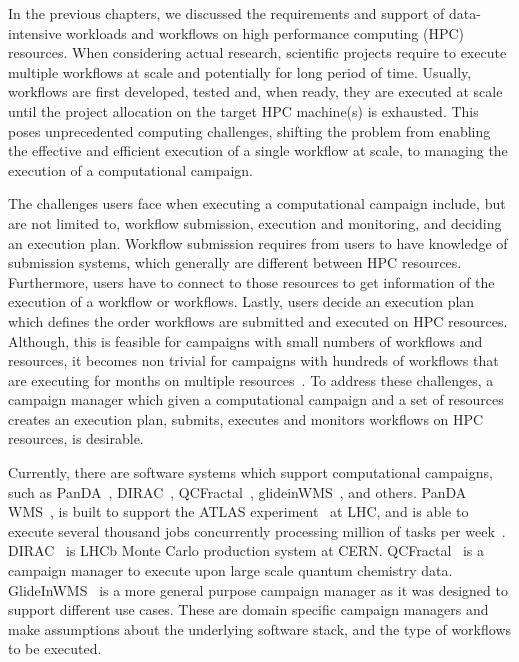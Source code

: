 \label{ch:cmanager}

In the previous chapters, we discussed the requirements and support of data-intensive workloads and workflows on high performance computing (HPC) resources. 
When considering actual research, scientific projects require to execute multiple workflows at scale and potentially for long period of time.
Usually, workflows are first developed, tested and, when ready, they are executed at scale until the project allocation on the target HPC machine(s) is exhausted. 
This poses unprecedented computing challenges, shifting the problem from enabling the effective and efficient execution of a single workflow at scale, to managing the execution of a computational campaign.

The challenges users face when executing a computational campaign include, but are not limited to, workflow submission, execution and monitoring, and deciding an execution plan.
Workflow submission requires from users to have knowledge of submission systems, which generally are different between HPC resources.
Furthermore, users have to connect to those resources to get information of the execution of a workflow or workflows.
Lastly, users decide an execution plan which defines the order workflows are submitted and executed on HPC resources.
Although, this is feasible for campaigns with small numbers of workflows and resources, it becomes non trivial for campaigns with hundreds of workflows that are executing for months on multiple resources~\cite{smith2020molssi}.
To address these challenges, a campaign manager which given a computational campaign and a set of resources creates an execution plan, submits, executes and monitors workflows on HPC resources, is desirable.

Currently, there are software systems which support computational campaigns, such as PanDA~\cite{maeno2008panda}, DIRAC~\cite{casajus2010dirac}, QCFractal~\cite{qcfractal}, glideinWMS~\cite{sfiligoi2008glidein}, and others.
PanDA WMS~\cite{maeno2008panda}, is built to support the ATLAS experiment~\cite{atlas} at LHC, and is able to execute several thousand jobs concurrently processing million of tasks per week~\cite{de2015future}.
DIRAC~\cite{tsaregorodtsev2003dirac} is LHCb Monte Carlo production system at CERN.
QCFractal~\cite{qcfractal} is a campaign manager to execute upon large scale quantum chemistry data.
GlideInWMS~\cite{sfiligoi2008glidein} is a more general purpose campaign manager as it was designed to support different use cases.
These are domain specific campaign managers and make assumptions about the underlying software stack, and the type of workflows to be executed.

